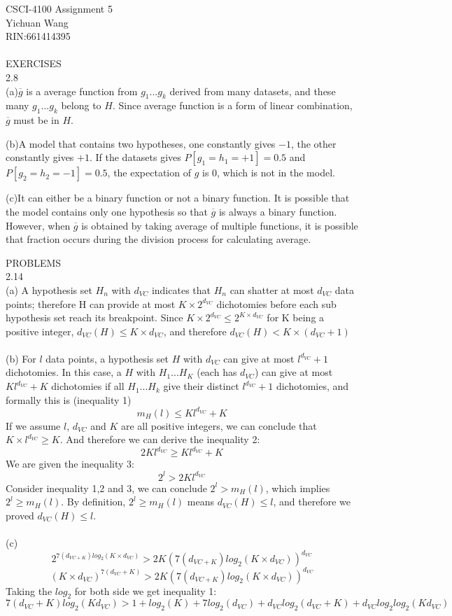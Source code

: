 \documentclass[12pt]{article}
\begin{document}
CSCI-4100 Assignment 5\\
Yichuan Wang \\
RIN:661414395\\\\

EXERCISES\\
2.8\\
(a)$\overline{g}$ is a average function from $g_1...g_k$ derived from many datasets, and these many $g_1...g_k$ belong to $H$. Since average function is a form of linear combination, $\overline{g}$ must be in $H$.

(b)A model that contains two hypotheses, one constantly gives $-1$, the other constantly gives $+1$. If the  datasets gives $P[g_1=h_1=+1]=0.5$ and $P[g_2=h_2=-1]=0.5$, the expectation of $g$ is 0, which is not in the model.

(c)It can either be a binary function or not a binary function. It is possible that the model contains only one hypothesis so that $\overline{g}$ is always a binary function. However, when $\overline{g}$ is obtained by taking average of multiple functions, it is possible that fraction occurs during the division process for calculating average.

PROBLEMS\\
2.14 \\
(a) A hypothesis set $H_n$ with $d_{VC}$ indicates that $H_n$ can shatter at most $d_{VC}$ data points; therefore H can provide at most $K\times2^{d_{VC}}$ dichotomies before each sub hypothesis set reach its breakpoint. Since $K\times 2^{d_{VC}} \leq 2^{K\times d_{VC}}$ for K being a positive integer, $d_{VC}(H)\leq K\times d_{VC}$, and therefore $d_{VC}(H)< K\times (d_{VC}+1)$\\\\
(b) For $l$ data points, a hypothesis set $H$ with $d_{VC}$ can give at most $l^{d_{VC}}+1$ dichotomies. In this case, a $H$ with $H_1...H_K$ (each has $d_{VC}$) can give at most $Kl^{d_{VC}}+K$ dichotomies if all $H_1...H_k$ give their distinct $l^{d_{VC}}+1$ dichotomies, and formally this is (inequality 1) $$m_H(l)\leq Kl^{d_{VC}}+K$$
If we assume $l$, $d_{VC}$ and $K$ are all positive integers, we can conclude that $K\times l^{d_{VC}}\geq K$. And therefore we can derive the inequality 2: $$2Kl^{d_{VC}}\geq Kl^{d_{VC}}+K$$
We are given the inequality 3: $$2^l>2Kl^{d_{VC}} $$
Consider inequality 1,2 and 3, we can conclude $2^l> m_H(l)$, which implies $2^l\geq m_H(l)$.
By definition, $2^l\geq m_H(l)$ means $d_{VC}(H)\leq l$, and therefore we proved $d_{VC}(H)\leq l$.\\\\
(c)\\
$$2^{7(d_{VC+K})log_2(K\times d_{VC})}>2K(7(d_{VC+K})log_2(K\times d_{VC}))^{d_{VC}}$$
$$(K\times d_{VC})^{7(d_{VC}+K)}>2K(7(d_{VC+K})log_2(K\times d_{VC}))^{d_{VC}}$$
Taking the $log_2$ for both side we get inequality 1:
$$7(d_{VC}+K)log_2(Kd_{VC})>1+log_2(K)+7log_2(d_{VC})+d_{VC}log_2(d_{VC}+K)+d_{VC}log_2log_2(Kd_{VC})$$
\end{document}
